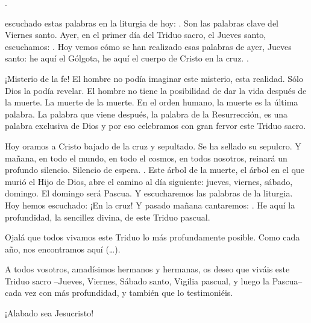 \begin{body}
.

 escuchado estas palabras en la liturgia de hoy: . Son las palabras clave del Viernes santo. Ayer, en el primer día del Triduo sacro, el Jueves santo, escuchamos: . Hoy vemos cómo se han realizado esas palabras de ayer, Jueves santo: he aquí el Gólgota, he aquí el cuerpo de Cristo en la cruz. .

¡Misterio de la fe! El hombre no podía imaginar este misterio, esta realidad. Sólo Dios la podía revelar. El hombre no tiene la posibilidad de dar la vida después de la muerte. La muerte de la muerte. En el orden humano, la muerte es la última palabra. La palabra que viene después, la palabra de la Resurrección, es una palabra exclusiva de Dios y por eso celebramos con gran fervor este Triduo sacro.

Hoy oramos a Cristo bajado de la cruz y sepultado. Se ha sellado su sepulcro. Y mañana, en todo el mundo, en todo el cosmos, en todos nosotros, reinará un profundo silencio. Silencio de espera. . Este árbol de la muerte, el árbol en el que murió el Hijo de Dios, abre el camino al día siguiente: jueves, viernes, sábado, domingo. El domingo será Pascua. Y escucharemos las palabras de la liturgia. Hoy hemos escuchado:  ¡En la cruz! Y pasado mañana cantaremos: . He aquí la profundidad, la sencillez divina, de este Triduo pascual.

Ojalá que todos vivamos este Triduo lo más profundamente posible. Como cada año, nos encontramos aquí (\ldots).


A todos vosotros, amadísimos hermanos y hermanas, os deseo que viváis este Triduo sacro –Jueves, Viernes, Sábado santo, Vigilia pascual, y luego la Pascua– cada vez con más profundidad, y también que lo testimoniéis.

¡Alabado sea Jesucristo!
\end{body}

